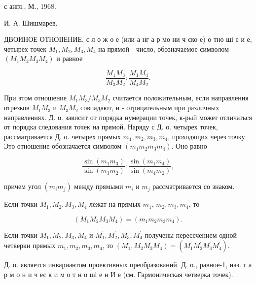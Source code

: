\documentclass[10pt]{article}
\begin{document}
с англ., М., 1968.

И. А. Шишмарев.



ДВОИНОЕ ОТНОІІЕНИЕ, с л $о$ ж о е (или а нг а р мо ни ч ско е) о тно ші е и е, четырех точек $M_{1}, M_{2}, M_{3}, M_{4}$ на прямой - число, обозначаемое символом $\left(M_{1} M_{2} M_{3} M_{4}\right)$ и равное



\[

\frac{M_{1} M_{3}}{M_{3} M_{2}}: \frac{M_{1} M_{4}}{M_{4} M_{2}} .

\]



При этом отношение $M_{1} M_{3} / M_{3} M_{2}$ считается положительным, если направления отрезков $M_{1} M_{3}$ и $M_{3} M_{2}$ совпадают, и - отрицательным при различных направлениях. Д. о. зависит от порядка нумерации точек, к-рый может отличаться от порядка следования точек на прямой. Наряду с Д. о. четырех точек, рассматривается Д. о. четырех прямых $m_{1}, m_{2}, m_{3}, m_{4}$, проходящих через точку. Это отношение обозначается символом $\left(m_{1} m_{2} m_{3} m_{4}\right)$. Оно равно



\[

\frac{\sin \left(m_{1} m_{3}\right)}{\sin \left(m_{3} m_{2}\right)}: \frac{\sin \left(m_{1} m_{4}\right)}{\sin \left(m_{4} m_{2}\right)},

\]



причем угол $\left(m_{i} m_{j}\right)$ между прямыми $m_{i}$ и $m_{j}$ рассматривается со знаком.



Если точки $M_{1}, M_{2}, M_{3}, M_{4}$ лежат на прямых $m_{1}$, $m_{2}, m_{3}, m_{4}$, то



\[

\left(M_{1} M_{2} M_{3} M_{4}\right)=\left(m_{1} m_{2} m_{3} m_{4}\right) .

\]



Если точки $M_{1}, M_{2}, M_{3}, M_{4}$ и $M_{1}^{\prime}, M_{2}^{\prime}, M_{3}^{\prime}, M_{4}^{\prime}$ получены пересечением одной четверки прямых $m_{1}, m_{2}, m_{3}, m_{4}$, то $\left(M_{1}, M_{2} M_{3} M_{4}\right)=\left(M_{1}^{\prime} M_{2}^{\prime} M_{3}^{\prime} M_{4}^{\prime}\right)$.



Д. о. является инвариантом проективных преобразований. Д. о., равное-1, наз. г а р м о н и ч ес к и м о т н о ші е н И е (см. Гармоническая четверка точек).
\end{document}
